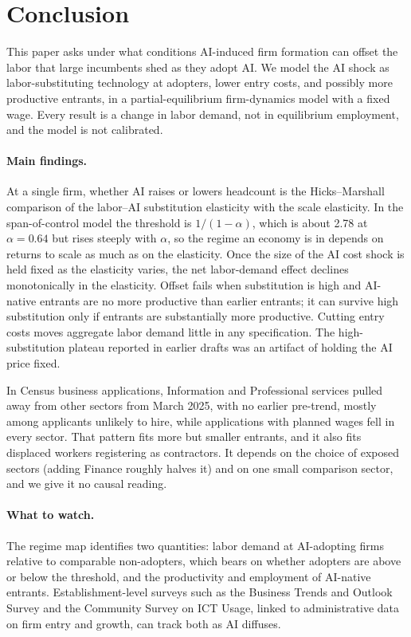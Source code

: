 \section{Conclusion}\label{sec:conclusion}


This paper asks under what conditions AI-induced firm formation can offset the labor that large incumbents shed as they adopt AI.
We model the AI shock as labor-substituting technology at adopters, lower entry costs, and possibly more productive entrants, in a partial-equilibrium firm-dynamics model with a fixed wage.
Every result is a change in labor demand, not in equilibrium employment, and the model is not calibrated.

\paragraph{Main findings.}
At a single firm, whether AI raises or lowers headcount is the Hicks--Marshall comparison of the labor--AI substitution elasticity with the scale elasticity.
In the span-of-control model the threshold is $1/(1-\alpha)$, which is about 2.78 at $\alpha = 0.64$ but rises steeply with $\alpha$, so the regime an economy is in depends on returns to scale as much as on the elasticity.
Once the size of the AI cost shock is held fixed as the elasticity varies, the net labor-demand effect declines monotonically in the elasticity.
Offset fails when substitution is high and AI-native entrants are no more productive than earlier entrants; it can survive high substitution only if entrants are substantially more productive.
Cutting entry costs moves aggregate labor demand little in any specification.
The high-substitution plateau reported in earlier drafts was an artifact of holding the AI price fixed.

In Census business applications, Information and Professional services pulled away from other sectors from March 2025, with no earlier pre-trend, mostly among applicants unlikely to hire, while applications with planned wages fell in every sector.
That pattern fits more but smaller entrants, and it also fits displaced workers registering as contractors.
It depends on the choice of exposed sectors (adding Finance roughly halves it) and on one small comparison sector, and we give it no causal reading.

\paragraph{What to watch.}
The regime map identifies two quantities: labor demand at AI-adopting firms relative to comparable non-adopters, which bears on whether adopters are above or below the threshold, and the productivity and employment of AI-native entrants.
Establishment-level surveys such as the Business Trends and Outlook Survey and the Community Survey on ICT Usage, linked to administrative data on firm entry and growth, can track both as AI diffuses.

